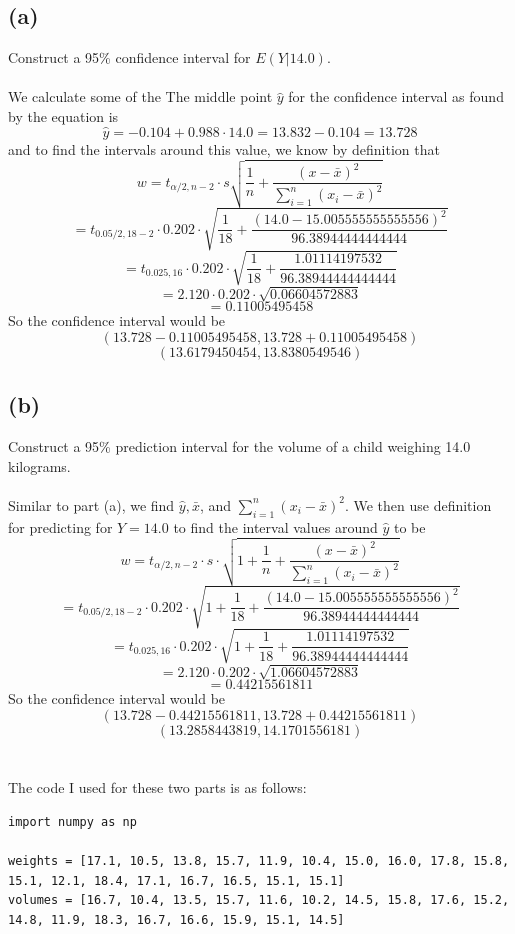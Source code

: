 \documentclass{article}
\begin{document}
{\subsection*{(a)} 
Construct a 95\% confidence interval for \(E(Y | 14.0)\).
\\
\\
We calculate some of the 
The middle point \(\hat{y}\) for the confidence interval as found by the equation is 
\[
\hat{y} = -0.104 + 0.988 \cdot 14.0 = 13.832 - 0.104 = 13.728 
\]
and to find the intervals around this value, we know by definition that 
\[
w = t_{\alpha / 2, n - 2} \cdot s \sqrt{\frac{1}{n} + \frac{(x - \bar{x})^2}{\sum_{i=1}^{n}(x_i - \bar{x})^2}}
\]
\[
= t_{0.05 / 2, 18 - 2} \cdot 0.202 \cdot \sqrt{\frac{1}{18} + \frac{(14.0 - 15.005555555555556)^2}{96.38944444444444}}
\]
\[
= t_{0.025, 16} \cdot 0.202 \cdot \sqrt{\frac{1}{18} + \frac{1.01114197532}{96.38944444444444}}
\]
\[
= 2.120 \cdot 0.202 \cdot \sqrt{0.06604572883}
\]
\[
= 0.11005495458
\]
So the confidence interval would be
\[
(13.728 - 0.11005495458, 13.728 + 0.11005495458)
\]
\[
(13.6179450454, 13.8380549546)
\]

\subsection*{(b)} 
Construct a 95\% prediction interval for the volume of a child weighing 14.0 kilograms.
\\
\\
Similar to part (a), we find \(\hat{y}, \bar{x} \), and \(\sum_{i=1}^{n} (x_i - \bar{x})^2\). We then use definition for predicting for \(Y = 14.0\) to find the interval values around \(\hat{y}\) to be 
\[
w = t_{\alpha / 2, n - 2} \cdot s \cdot \sqrt{1 + \frac{1}{n} + \frac{(x - \bar{x})^2}{\sum_{i=1}^{n}(x_i - \bar{x})^2}}
\]
\[
= t_{0.05 / 2, 18 - 2} \cdot 0.202 \cdot \sqrt{1 + \frac{1}{18} + \frac{(14.0 - 15.005555555555556)^2}{96.38944444444444}}
\]
\[
= t_{0.025, 16} \cdot 0.202 \cdot \sqrt{1 + \frac{1}{18} + \frac{1.01114197532}{96.38944444444444}}
\]
\[
= 2.120 \cdot 0.202 \cdot \sqrt{1.06604572883}
\]
\[
= 0.44215561811
\]
So the confidence interval would be 
\[
(13.728 - 0.44215561811, 13.728 + 0.44215561811)
\]
\[
(13.2858443819, 14.1701556181)
\]
\\
\\
The code I used for these two parts is as follows:
\begin{verbatim}
import numpy as np

weights = [17.1, 10.5, 13.8, 15.7, 11.9, 10.4, 15.0, 16.0, 17.8, 15.8, 15.1, 12.1, 18.4, 17.1, 16.7, 16.5, 15.1, 15.1]
volumes = [16.7, 10.4, 13.5, 15.7, 11.6, 10.2, 14.5, 15.8, 17.6, 15.2, 14.8, 11.9, 18.3, 16.7, 16.6, 15.9, 15.1, 14.5]


\end{verbatim}}
\end{document}
